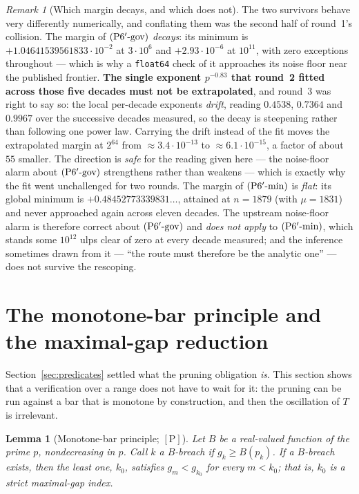 \documentclass[11pt,a4paper]{article}
\theoremstyle{plain}
\newtheorem{lemma}[theorem]{Lemma}
\theoremstyle{definition}
\theoremstyle{remark}
\newtheorem{remark}[theorem]{Remark}
\newcommand{\cP}{{[\mathrm{P}]}}
\newcommand{\Pgov}{\textup{(P6$'$-gov)}}
\newcommand{\Pmin}{\textup{(P6$'$-min)}}
\begin{document}
\begin{remark}[Which margin decays, and which does not]
\label{rem:margins}
The two survivors behave very differently numerically, and conflating them was the second half
of round~1's collision. The margin of $\Pgov$ \emph{decays}: its minimum is
$+1.04641539561833\cdot10^{-2}$ at $3\cdot10^6$ and $+2.93\cdot10^{-6}$ at $10^{11}$, with zero
exceptions throughout --- which is why a \texttt{float64} check of it approaches its noise floor
near the published frontier. \textbf{The single exponent $p^{-0.83}$ that round~2 fitted across
those five decades must not be extrapolated}, and round~3 was right to say so: the local
per-decade exponents \emph{drift}, reading $0.4538$, $0.7364$ and $0.9967$ over the successive
decades measured, so the decay is steepening rather than following one power law. Carrying the
drift instead of the fit moves the extrapolated margin at $2^{64}$ from $\approx3.4\cdot10^{-13}$
to $\approx6.1\cdot10^{-15}$, a factor of about $55$ smaller. The direction is \emph{safe} for
the reading given here --- the noise-floor alarm about $\Pgov$ strengthens rather than weakens
--- which is exactly why the fit went unchallenged for two rounds. The margin of $\Pmin$ is
\emph{flat}: its global minimum is
$+0.48452773339831\ldots$, attained at $n = 1879$ (with $\mu = 1831$) and never approached
again across eleven decades. The upstream noise-floor alarm is therefore correct about $\Pgov$
and \emph{does not apply} to $\Pmin$, which stands some $10^{12}$ ulps clear of zero at every
decade measured; and the inference sometimes drawn from it --- ``the route must therefore be
the analytic one'' --- does not survive the rescoping.
\end{remark}

\section{The monotone-bar principle and the maximal-gap reduction}
\label{sec:monotone}

Section~\ref{sec:predicates} settled what the pruning obligation \emph{is}. This section shows
that a verification over a range does not have to wait for it: the pruning can be run against a
bar that is monotone by construction, and then the oscillation of $T$ is irrelevant.

\begin{lemma}[Monotone-bar principle; $\cP$]
\label{lem:M}
Let $B$ be a real-valued function of the prime $p$, nondecreasing in $p$. Call $k$ a
\emph{$B$-breach} if $g_k \ge B(p_k)$. If a $B$-breach exists, then the least one, $k_0$,
satisfies $g_m < g_{k_0}$ for every $m < k_0$; that is, $k_0$ is a strict maximal-gap index.
\end{lemma}
\end{document}

